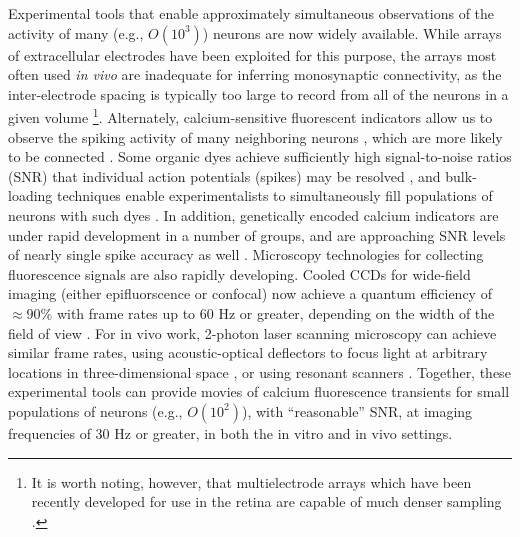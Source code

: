 Experimental tools that enable approximately simultaneous observations of the activity of many (e.g., $O(10^3)$) neurons are now widely available. While arrays of extracellular electrodes have been exploited for this purpose, the arrays most often used \emph{in vivo} are inadequate for inferring monosynaptic connectivity, as the inter-electrode spacing is typically too large to record from all of the neurons in a given volume \cite{HATS98,HARR03,Stein04,Santhanam06,Harris07} \footnote{It is worth noting, however, that multielectrode arrays which have been recently developed for use in the retina are capable of much denser sampling \cite{Berry2004,Litke2004,Petrusca07,PILL07}.}. Alternately, calcium-sensitive fluorescent indicators allow us to observe the spiking activity of many neighboring neurons \cite{Tsien89}, which are more likely to be connected \cite{Abeles91, Braitenberg1998}. Some organic dyes achieve sufficiently high signal-to-noise ratios (SNR) that individual action potentials (spikes) may be resolved \cite{ImagingManual}, and bulk-loading techniques enable experimentalists to simultaneously fill populations of neurons with such dyes \cite{StosiekKonnerth03}. In addition, genetically encoded calcium indicators are under rapid development in a number of groups, and are approaching SNR levels of nearly single spike accuracy as well \cite{WallaceHasan08}. Microscopy technologies for collecting fluorescence signals are also rapidly developing. Cooled CCDs for wide-field imaging (either epifluorscence or confocal) now achieve a quantum efficiency of $\approx 90 \%$ with frame rates up to $60$ Hz or greater, depending on the width of the field of view \cite{Djurisic04}. For in vivo work, 2-photon laser scanning microscopy can achieve similar frame rates, using acoustic-optical deflectors to focus light at arbitrary locations in three-dimensional space \cite{ReddySaggau05, Iyer06, SalomeBourdieu06, ReddySaggau08}, or using resonant scanners \cite{NguyenParker01}. Together, these experimental tools can provide movies of calcium fluorescence transients for small populations of neurons (e.g., $O(10^2)$), with ``reasonable'' SNR, at imaging frequencies of 30 Hz or greater, in both the in vitro and in vivo settings.

